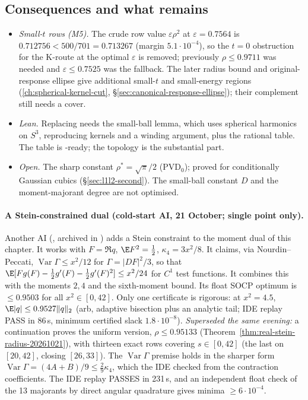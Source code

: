 \subsection{Consequences and what remains}
\begin{itemize}
\item \emph{Small-$t$ rows (M5).} The crude row value $\varepsilon\rho^2$ at $\varepsilon=0.7564$ is $0.712756<500/701=0.713267$ (margin
$5.1\cdot10^{-4}$), so the $t=0$ obstruction for the K-route at the optimal $\varepsilon$ is removed; previously $\rho\le0.9711$ was needed and
$\varepsilon\le0.7525$ was the fallback. The later radius bound and original-response ellipse give additional small-$t$ and small-energy regions (\autoref{ch:spherical-kernel-cut}, \S\ref{sec:canonical-response-ellipse}); their complement still needs a cover.
\item \emph{Lean.} Replacing  needs the small-ball lemma, which uses spherical harmonics on $S^3$, reproducing kernels and a winding
argument, plus the rational table. The table is -ready; the topology is the substantial part.
\item \emph{Open.} The sharp constant $\rho^*=\sqrt\pi/2$ (PVD$_0$); proved for conditionally Gaussian cubics (\S\ref{sec:l1l2-second}). The small-ball constant $D$ and the moment-majorant degree are not optimised.
\end{itemize}

\paragraph{A Stein-constrained dual (cold-start AI, 21 October; single point only).} Another AI (, archived in
) adds a Stein constraint to the moment dual of this chapter. It works with $F=\Re q$, $\E F^2=\frac12$, $\kappa_4=3x^2/8$.
It claims, via Nourdin--Peccati, $\operatorname{Var}\Gamma\le x^2/12$ for $\Gamma=|DF|^2/3$, so that $\E[Fg(F)-\frac12g'(F)-\frac12g'(F)^2]\le x^2/24$ for $C^1$ test functions. It combines this with
the moments $2,4$ and the sixth-moment bound. Its float SOCP optimum is $\le0.9503$ for all $x^2\in[0,42]$. Only one certificate is rigorous:
at $x^2=4.5$, $\E|q|\le0.9527\|q\|_2$ (arb, adaptive bisection plus an analytic tail; IDE replay PASS in 86\,s, minimum certified slack $1.8\cdot10^{-8}$).
\emph{Superseded the same evening:} a continuation proves the uniform version, $\rho\le0.95133$ (Theorem~\ref{thm:real-stein-radius-20261021}),
with thirteen exact rows covering $s\in[0,42]$ (the last on $[20,42]$, closing $[26,33]$). The $\operatorname{Var}\Gamma$ premise holds in the sharper form
$\operatorname{Var}\Gamma=(4A+B)/9\le\frac29\kappa_4$, which the IDE checked from the contraction coefficients. The IDE replay  PASSES in 231\,s, and an independent
float check of the 13 majorants by direct angular quadrature gives minima $\ge6\cdot10^{-4}$.
